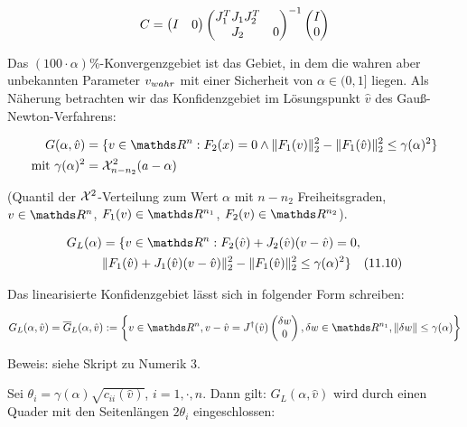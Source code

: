 
\begin{align*}
C &= \begin{pmatrix} I & 0 \end{pmatrix} \begin{pmatrix} J_1^T J_1 J_2^T \\ J_2 & 0 \end{pmatrix}^{-1} \begin{pmatrix} I \\ 0 \end{pmatrix} \\
\end{align*}


Das $(100\cdot\alpha)\%$-Konvergenzgebiet ist das Gebiet, in dem die wahren aber unbekannten Parameter $v_{wahr}$ mit einer Sicherheit von $\alpha \in (0,1]$ liegen. Als Näherung betrachten wir das Konfidenzgebiet im Lösungspunkt $\hat v$ des Gauß-Newton-Verfahrens:

\begin{align*}
G(\alpha, \hat v) &= \{ v \in \R^n : F_2(x) = 0 \wedge \|F_1(v)\|_2^2 - \|F_1(\hat v)\|_2^2 \leq \gamma(\alpha)^2 \} \\
\text{mit } \gamma(\alpha)^2 &= \Chi_{n-n_2}^2 (a-\alpha)
\end{align*}

(Quantil der $\mathcal{X}^2$-Verteilung zum Wert $\alpha$ mit $n-n_2$ Freiheitsgraden, $v \in \R^n$, $F_1(v) \in \R^{n_1}$, $F_2(v) \in \R^{n_2}$).


\begin{align*}
G_L(\alpha) &= \{ v \in \R^n : F_2(\hat v) + J_2(\hat v) (v-\hat v) = 0, \\
& \|F_1(\hat v) + J_1(\hat v)(v-\hat v) \|_2^2 - \|F_1(\hat v)\|_2^2 \leq \gamma(\alpha)^2 \} \quad (11.10) \\
\end{align*}


Das linearisierte Konfidenzgebiet lässt sich in folgender Form schreiben:

\[ G_L(\alpha, \hat v) = \ov G_L(\alpha, \hat v) := \l\{ v \in \R^n, v - \hat v = J^\dagger(\hat v) \bpm \delta w \\ 0 \epm, \delta w \in \R^{n_1}, \|\delta w\|\leq \gamma(\alpha) \r\} \]

Beweis: siehe \zb Skript zu Numerik 3.


Sei $\theta_i = \gamma(\alpha) \sqrt{c_{ii} ( \hat v) }$, $i=1,\cdot,n$. Dann gilt: $G_L(\alpha, \hat v)$ wird durch einen Quader mit den Seitenlängen $2\theta_i$ eingeschlossen:

